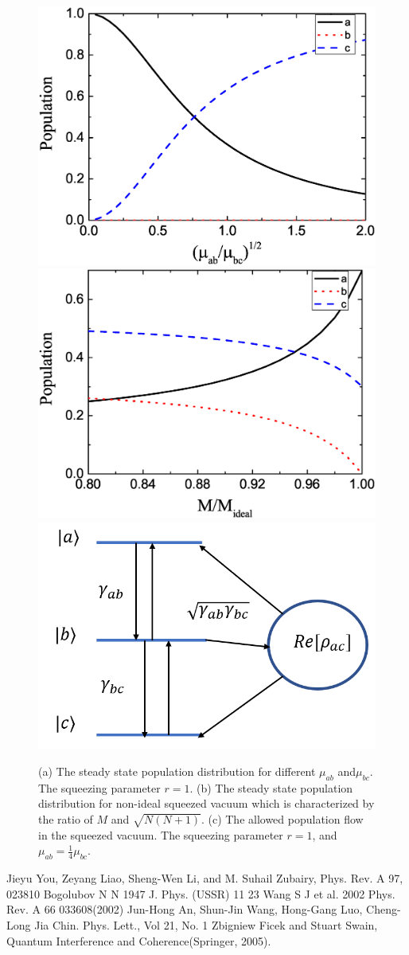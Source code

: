 \documentclass{article}
\begin{document}
\begin{figure}
\includegraphics[width=0.48\columnwidth]{atom_fig4.eps}
\includegraphics[width=0.48\columnwidth]{atom_fig5.eps}
\includegraphics[width=0.4\columnwidth]{atom_fig3.png}
\caption{(a) The steady state population distribution for different $\mu_{ab}$ and$\mu_{bc}$. The squeezing parameter $r=1$. (b) The steady state population distribution for non-ideal squeezed vacuum which is characterized by the ratio of $M$ and $\sqrt{N(N+1)}$. (c) The allowed population flow in the squeezed vacuum. The squeezing parameter $r=1$, and $\mu_{ab}=\frac{1}{4}\mu_{bc}$.}
\label{2}
\end{figure}



\begin{thebibliography}{99}
 Jieyu You, Zeyang Liao, Sheng-Wen Li, and M. Suhail Zubairy, Phys. Rev. A 97, 023810 
 Bogolubov N N 1947 J. Phys. (USSR) 11 23
 Wang S J et al. 2002 Phys. Rev. A 66 033608(2002)
 Jun-Hong An, Shun-Jin Wang, Hong-Gang Luo, Cheng-Long Jia Chin. Phys. Lett., Vol 21, No. 1
 Zbigniew Ficek and Stuart Swain, Quantum Interference
and Coherence(Springer, 2005).

\end{thebibliography} 
\end{document}
